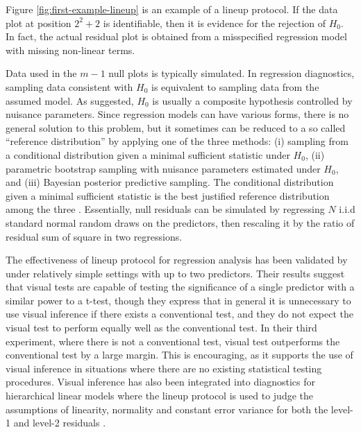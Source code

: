 \documentclass[]{interact}
\theoremstyle{plain}%
\theoremstyle{definition}
\theoremstyle{remark}
\begin{document}
Figure \ref{fig:first-example-lineup} is an example of a lineup
protocol. If the data plot at position \(2^2 + 2\) is identifiable, then
it is evidence for the rejection of \(H_0\). In fact, the actual
residual plot is obtained from a misspecified regression model with
missing non-linear terms.

Data used in the \(m - 1\) null plots is typically simulated. In
regression diagnostics, sampling data consistent with \(H_0\) is
equivalent to sampling data from the assumed model. As
\citet{buja_statistical_2009} suggested, \(H_0\) is usually a composite
hypothesis controlled by nuisance parameters. Since regression models
can have various forms, there is no general solution to this problem,
but it sometimes can be reduced to a so called ``reference
distribution'' by applying one of the three methods: (i) sampling from a
conditional distribution given a minimal sufficient statistic under
\(H_0\), (ii) parametric bootstrap sampling with nuisance parameters
estimated under \(H_0\), and (iii) Bayesian posterior predictive
sampling. The conditional distribution given a minimal sufficient
statistic is the best justified reference distribution among the three
\citep{buja_statistical_2009}. Essentially, null residuals can be
simulated by regressing \(N\) i.i.d standard normal random draws on the
predictors, then rescaling it by the ratio of residual sum of square in
two regressions.

The effectiveness of lineup protocol for regression analysis has been
validated by \citet{majumder_validation_2013} under relatively simple
settings with up to two predictors. Their results suggest that visual
tests are capable of testing the significance of a single predictor with
a similar power to a t-test, though they express that in general it is
unnecessary to use visual inference if there exists a conventional test,
and they do not expect the visual test to perform equally well as the
conventional test. In their third experiment, where there is not a
conventional test, visual test outperforms the conventional test by a
large margin. This is encouraging, as it supports the use of visual
inference in situations where there are no existing statistical testing
procedures. Visual inference has also been integrated into diagnostics
for hierarchical linear models where the lineup protocol is used to
judge the assumptions of linearity, normality and constant error
variance for both the level-1 and level-2 residuals
\citep[\citet{loy2014hlmdiag} and
\citet{loy2015you}]{loy2013diagnostic}.
\end{document}
